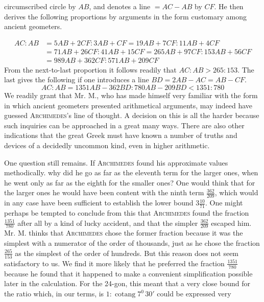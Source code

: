 %
circumscribed circle by \(AB\), and denotes a line \(=AC-AB\) by \(CF\). He then derives the following proportions by arguments in the form customary among ancient geometers.
\par
{\fontsize{10}{12}\selectfont
\[
\begin{aligned}
AC:AB&=5AB+2CF:3AB+CF=19AB+7CF:11AB+4CF\\
&=71AB+26CF:41AB+15CF=265AB+97CF:153AB+56CF\\
&=989AB+362CF:571AB+209CF
\end{aligned}
\]
}
From the next-to-last proportion it follows readily that \(AC:AB>265:153\). The last gives the following if one introduces a line \(BD=2AB-AC=AB-CF\).
\[
AC:AB=1351AB-362BD:780AB-209BD<1351:780
\]
We readily grant that Mr. M., who has made himself very familiar with the form in which ancient geometers presented arithmetical arguments, may indeed have guessed \textsc{Archimedes}'s line of thought. A decision on this is all the harder because such inquiries can be approached in a great many ways. There are also other indications that the great Greek must have known a number of truths and devices of a decidedly uncommon kind, even in higher arithmetic.

One question still remains. If \textsc{Archimedes} found his approximate values methodically. why did he go as far as the eleventh term for the larger ones, when he went only as far as the eighth for the smaller ones? One would think that for the larger ones he would have been content with the ninth term \(\frac{362}{209}\), which would in any case have been sufficient to establish the lower bound \(3\frac{10}{71}\). One might perhaps be tempted to conclude from this that \textsc{Archimedes} found the fraction \(\frac{1351}{780}\) after all by a kind of lucky accident, and that the simpler \(\frac{362}{209}\) escaped him. Mr. M. thinks that \textsc{Archimedes} chose the former fraction because it was the simplest with a numerator of the order of thousands, just as he chose the fraction \(\frac{265}{153}\) as the simplest of the order of hundreds. But this reason does not seem satisfactory to us. We find it more likely that he preferred the fraction \(\frac{1351}{780}\) because he found that it happened to make a convenient simplification possible later in the calculation. For the 24-gon, this meant that a very close bound for the ratio which, in our terms, is \(1:\operatorname{cotang}7^0\,30'\) could be expressed very %
